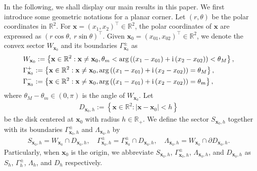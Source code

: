 \documentclass[11pt,reqno,oneside]{amsart}
\theoremstyle{definition}
\theoremstyle{remark}
\numberwithin{equation}{section}
\numberwithin{equation}{section}
\theoremstyle{remark}
\begin{document}
In the following, we shall display our main results in this paper. We first introduce some geometric notations for a planar corner. Let $ \left(r, \theta\right) $ be the polar coordinates in $ \mathbb{R}^2 $. For $ \mathbf{x} = \left(x_1, x_2\right)^\top \in \mathbb{R}^2 $, the polar coordinates of $ \mathbf{x} $ are expressed as $ \left( r\cos\theta, \ r\sin\theta \right)^\top $. Given $ \mathbf{x}_0=\left(x_{01},x_{02}\right)^{\top}\in \mathbb{R}^2 $, we denote the convex sector $ W_{\mathbf{x}_0} $ and its boundaries $ \Gamma^{\pm}_{\mathbf{x}_0} $ as  
\begin{align*} 
	& W_{\mathbf{x}_0} := \left\{ \mathbf{x} \in \mathbb{R}^{2}:\mathbf{x} \neq \mathbf{x}_0, \theta_{m} < \arg \left( \left(x_1-x_{01}\right)+\text{i}\left(x_2-x_{02}\right) \right) < \theta_{M} \right\}, \notag \\
	& \Gamma^+_{\mathbf{x}_0} := \left\{ \mathbf{x} \in \mathbb{R}^{2} :\mathbf{x} \neq \mathbf{x}_0, \arg \left( \left(x_1-x_{01}\right)+\text{i}\left(x_2-x_{02}\right) \right) = \theta_{M} \right\}, \notag\\ 
	& \Gamma^-_{\mathbf{x}_0} := \left\{ \mathbf{x} \in \mathbb{R}^{2} :\mathbf{x} \neq \mathbf{x}_0, \arg \left( \left(x_1-x_{01}\right)+\text{i}\left(x_2-x_{02}\right) \right) = \theta_{m} \right\}, 
\end{align*}
where $ \theta_M - \theta_m \in\left(0,\pi\right) $ is the angle of $ W_{\mathbf{x}_0} $. Let 
\begin{align} \label{def_introduction_Dx0h}
	D_{\mathbf{x}_0,h}:=\left\{\mathbf{x} \in \mathbb{R}^2:\left| \mathbf{x}-\mathbf{x}_0 \right| < h\right\}
\end{align}
be the disk centered at $ \mathbf{x}_0 $ with radius $ h \in \mathbb{R}_+ $. We define the sector $ S_{\mathbf{x}_0,h} $ together with its boundaries $ \Gamma_{\mathbf{x}_0,h}^\pm $ and $ \Lambda_{\mathbf{x}_0,h} $ by
\begin{align} \label{def_inverse_problem_local_sector_Sh_Gammah_Lambdah}
	S_{\mathbf{x}_0,h} = W_{\mathbf{x}_0} \cap D_{\mathbf{x}_0,h}, \quad \Gamma_{\mathbf{x}_0,h}^\pm = \Gamma^\pm_{\mathbf{x}_0} \cap D_{\mathbf{x}_0,h}, \quad \Lambda_{\mathbf{x}_0,h} = W_{\mathbf{x}_0} \cap \partial D_{\mathbf{x}_0,h} .
\end{align}  
Particularly, when $ \mathbf{x}_0 $ is the origin, we abbreviate $ S_{\mathbf{x}_0,h} $, $ \Gamma_{\mathbf{x}_0,h}^\pm $, $ \Lambda_{\mathbf{x}_0,h} $, and $ D_{\mathbf{x}_0,h} $ as $ S_h $, $ \Gamma_h^\pm $, $ \Lambda_h $, and $ D_h $ respectively.
\end{document}
